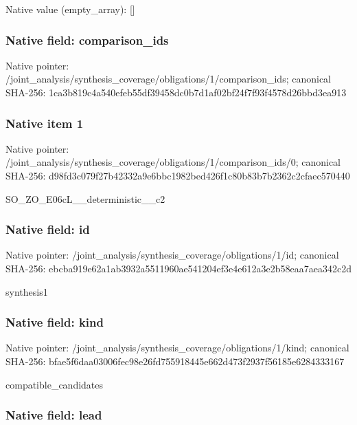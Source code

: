 \documentclass[10pt,a4paper]{article}
\begin{document}
Native value (empty\_array): []



\subsubsection{Native field: comparison\_ids}


Native pointer: /joint\_analysis/synthesi\allowbreak{}s\_coverage/obligations/1\allowbreak{}/comparison\_ids; canonical SHA-256: 1ca3b819c4a540efeb55df39\allowbreak{}458dc0b7d1af02bf24f7f93f\allowbreak{}4578d26bbd3ea913



\subsubsection{Native item 1}


Native pointer: /joint\_analysis/synthesi\allowbreak{}s\_coverage/obligations/1\allowbreak{}/comparison\_ids/0; canonical SHA-256: d98fd3c079f27b42332a9e6b\allowbreak{}bc1982bed426f1c80b83b7b2\allowbreak{}362c2cfaec570440


SO\_ZO\_E06cL\_\_deterministic\_\_c2


\subsubsection{Native field: id}


Native pointer: /joint\_analysis/synthesi\allowbreak{}s\_coverage/obligations/1\allowbreak{}/id; canonical SHA-256: ebcba919e62a1ab3932a5511\allowbreak{}960ae541204ef3e4e612a3e2\allowbreak{}b58eaa7aea342c2d


synthesis1


\subsubsection{Native field: kind}


Native pointer: /joint\_analysis/synthesi\allowbreak{}s\_coverage/obligations/1\allowbreak{}/kind; canonical SHA-256: bfae5f6daa03006fec98e26f\allowbreak{}d755918445e662d473f2937f\allowbreak{}56185e6284333167


compatible\_candidates


\subsubsection{Native field: lead}
\end{document}
